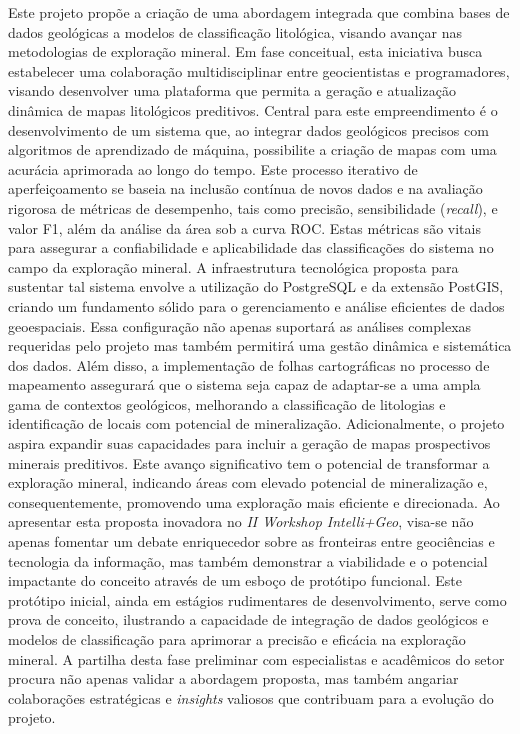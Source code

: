 \documentclass{article} %
\begin{document}

\par{Este projeto propõe a criação de uma abordagem integrada que combina bases de dados
geológicas a modelos de classificação litológica, visando avançar nas
metodologias de exploração mineral. Em fase conceitual, esta iniciativa busca estabelecer
uma colaboração multidisciplinar entre geocientistas e programadores, visando
desenvolver uma plataforma que permita a geração e atualização dinâmica de mapas
litológicos preditivos. Central para este empreendimento é o desenvolvimento de um
sistema que, ao integrar dados geológicos precisos com algoritmos de aprendizado de
máquina, possibilite a criação de mapas com uma acurácia aprimorada ao longo do tempo.
Este processo iterativo de aperfeiçoamento se baseia na inclusão contínua de novos dados
e na avaliação rigorosa de métricas de desempenho, tais como precisão, sensibilidade
(\textit{recall}), e valor F1, além da análise da área sob a curva ROC. Estas métricas são vitais
para assegurar a confiabilidade e aplicabilidade das classificações do sistema no campo
da exploração mineral. A infraestrutura tecnológica proposta para sustentar tal sistema
envolve a utilização do PostgreSQL e da extensão PostGIS, criando um fundamento sólido
para o gerenciamento e análise eficientes de dados geoespaciais. Essa configuração não
apenas suportará as análises complexas requeridas pelo projeto mas também permitirá
uma gestão dinâmica e sistemática dos dados. Além disso, a implementação de folhas
cartográficas no processo de mapeamento assegurará que o sistema seja capaz de
adaptar-se a uma ampla gama de contextos geológicos, melhorando a classificação de
litologias e identificação de locais com potencial de mineralização. Adicionalmente, o
projeto aspira expandir suas capacidades para incluir a geração de mapas prospectivos
minerais preditivos. Este avanço significativo tem o potencial de transformar a exploração
mineral, indicando áreas com elevado potencial de mineralização e, consequentemente,
promovendo uma exploração mais eficiente e direcionada. Ao apresentar esta proposta
inovadora no \textit{II Workshop Intelli+Geo}, visa-se não apenas fomentar um debate
enriquecedor sobre as fronteiras entre geociências e tecnologia da informação, mas
também demonstrar a viabilidade e o potencial impactante do conceito através de um
esboço de protótipo funcional. Este protótipo inicial, ainda em estágios rudimentares de
desenvolvimento, serve como prova de conceito, ilustrando a capacidade de integração de
dados geológicos e modelos de classificação para aprimorar a precisão e eficácia na
exploração mineral. A partilha desta fase preliminar com especialistas e acadêmicos do
setor procura não apenas validar a abordagem proposta, mas também angariar
colaborações estratégicas e \textit{insights} valiosos que contribuam para a evolução do projeto.}
\end{document}

